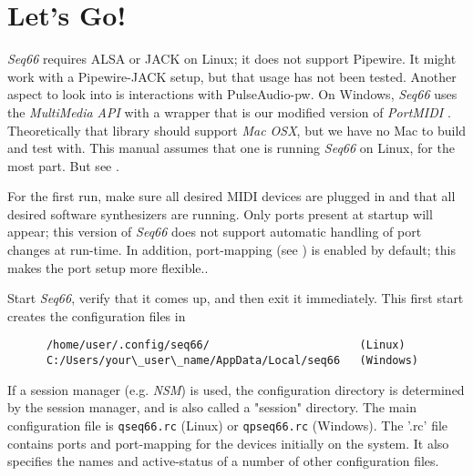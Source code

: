%
%
%

\section{Let's Go!}
\label{sec:introduction_lets_go}

   \textsl{Seq66} requires ALSA or JACK on Linux;
   it does not support
   Pipewire.
   It might work with a Pipewire-JACK setup, but that usage has not been
   tested.
   Another aspect to look into is interactions with
   PulseAudio-pw.
   On Windows, \textsl{Seq66} uses the \textsl{MultiMedia API} with a wrapper
   that is our modified version of \textsl{PortMIDI} \cite{portmidi}.
   Theoretically that library should support
   \textsl{Mac OSX}, but we have no Mac to build and test with.
   This manual assumes that one is running \textsl{Seq66} on Linux, for the
   most part.
   But see .

   For the first run, make sure all desired MIDI devices are plugged in and
   that all desired software synthesizers are running.
   Only ports present at startup will appear; this version of
   \textsl{Seq66} does not
   support automatic handling of port changes at run-time.
   In addition, port-mapping (see ) is
   enabled by default; this makes the port setup more flexible..

   Start \textsl{Seq66}, verify that it comes up, and then exit it
   immediately.
   This first start creates the configuration files in

   \begin{verbatim}
      /home/user/.config/seq66/                       (Linux)
      C:/Users/your\_user\_name/AppData/Local/seq66   (Windows)
   \end{verbatim}

   If a session manager (e.g. \textsl{NSM})
   is used, the configuration directory is determined by
   the session manager, and is also called a "session" directory.
   The main configuration file is
   \texttt{qseq66.rc} (Linux) or
   \texttt{qpseq66.rc} (Windows).
   The '.rc' file contains ports and port-mapping for the devices
   initially on the system.
   It also specifies the names and active-status
   of a number of other configuration files.

